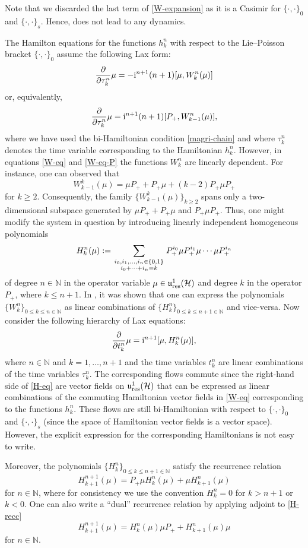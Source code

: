 \documentclass[10pt,a4paper]{amsart}
\theoremstyle{definition}
\numberwithin{equation}{section}
\newcommand{\N}{\mathbb N}
\renewcommand{\H}{\mathcal{H}}
\newcommand{\urp}{\mathfrak u_{\textnormal{res}}^1(\H)}
\newcommand{\pb}{\{\cdot,\cdot\}}
\newcommand{\be}{\begin{equation}}
\newcommand{\ee}{\end{equation}}
\begin{document}
Note that we discarded the last term of \eqref{W-expansion} as it is a Casimir for $\pb_0$ and $\pb_s$. Hence, does not lead to any dynamics.

The Hamilton equations for the functions $h_k^n$ with respect to the Lie--Poisson bracket $\pb_0$ assume the following Lax form:
\be \label{W-eq}\frac{\partial}{\partial\tau_k^n} \mu = - {\rm i}^{n+1}(n+1) [\mu, W_k^n(\mu)] \ee
or, equivalently,
\be \label{W-eq-P}\frac{\partial}{\partial\tau_k^n} \mu = {\rm i}^{n+1}(n+1) [P_+, W_{k-1}^n(\mu)],\ee
where we have used the bi-Hamiltonian condition \eqref{magri-chain} and where $\tau_k^n$ denotes the time variable corresponding to the Hamiltonian $h^n_k$.
However, in equations \eqref{W-eq} and \eqref{W-eq-P} the functions $W^n_k$ are linearly dependent. For instance, one can observed that \[
W^k_{k-1}(\mu) = \mu P_+ + P_+ \mu + (k-2)P_+\mu P_+
\] for $k\geq 2$. Consequently, the family $\bigl\{W^k_{k-1}(\mu)\bigr\}_{k\geq 2}$ spans only a two-dimensional subspace generated by $\mu P_+ + P_+\mu$ and $P_+\mu P_+$. Thus, one might modify the system in question by introducing linearly independent homogeneous polynomials
\be \label{Hnk} H_k^n(\mu):= \sum_{
\genfrac{}{}{0pt}1{i_0,i_1,\dots, i_n\in\{0,1\}}{i_0+\dots +i_n=k}
} P_+^{i_0}\mu P_+^{i_1}\mu\cdots \mu P_+^{i_n}\ee
of degree $n\in\N$ in the operator variable $\mu\in \urp$ and degree $k$ in the operator $P_+$, where $k\leq n+1$.
In \cite[Proposition~3.1]{GO-grass}, it was shown that one can express the polynomials $\{W^n_k\}_{0\leq k\leq n\in\N } $ as linear combinations of $\{H_k^n\}_{0\leq k\leq n+1\in\N }$ and vice-versa.
Now consider the following hierarchy of Lax equations:
\be \label{H-eq}\frac\partial{\partial t_k^n}\mu = {\rm i}^{n+1} [\mu, H_k^n(\mu)],\ee
where $n\in\N$ and $k=1,\dots, n+1$ and the time variables $t^n_k$ are linear combinations of the time variables $\tau^n_k$. The corresponding flows commute since the right-hand side of \eqref{H-eq} are vector fields on $\urp$ that can be expressed as linear combinations of the commuting Hamiltonian vector fields in \eqref{W-eq} corresponding to the functions $h^n_k$. These flows are still bi-Hamiltonian with respect to $\pb_0$ and $\pb_s$ (since the space of Hamiltonian vector fields is a vector space). However, the explicit expression for the corresponding Hamiltonians is not easy to write.

Moreover, the polynomials $\{H_k^n\}_{0\leq k\leq n+1\in\N }$ satisfy the recurrence relation
\be \label{H-recc} H^{n+1}_{k+1}(\mu)=P_+\mu H_k^n(\mu)+\mu H^n_{k+1}(\mu)\ee
for $n\in \N$, where for consistency we use the convention $H^n_k=0$ for $k>n+1$ or $k<0$.
One can also write a ``dual'' recurrence relation by applying adjoint to \eqref{H-recc}
\be\label{H-recc-dual} H^{n+1}_{k+1}(\mu)=H_k^n(\mu)\mu P_+ +H^n_{k+1}(\mu)\mu \ee
for $n\in \N$.
\end{document}
